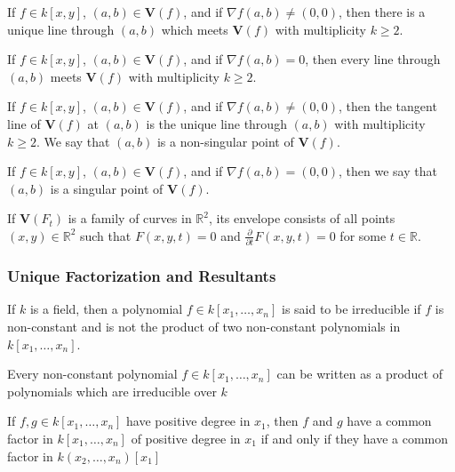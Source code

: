 \documentclass[../main.tex]{subfiles}
\begin{document}
\begin{theorem}
If $f\in k[x,y]$, $(a,b) \in \textbf{V}(f)$, and if $\nabla f(a,b) \ne (0,0)$, then there is a unique line through $(a,b)$ which meets $\textbf{V}(f)$ with multiplicity $k\geq 2$.
\end{theorem}

\begin{theorem}
If $f\in k[x,y]$, $(a,b) \in \textbf{V}(f)$, and if $\nabla f(a,b) = 0$, then every line through $(a,b)$ meets $\textbf{V}(f)$ with multiplicity $k \geq 2$.
\end{theorem}

\begin{definition}
If $f\in k[x,y]$, $(a,b) \in \textbf{V}(f)$, and if $\nabla f(a,b) \ne (0,0)$, then the tangent line of $\textbf{V}(f)$ at $(a,b)$ is the unique line through $(a,b)$ with multiplicity $k\geq 2$. We say that $(a,b)$ is a non-singular point of $\textbf{V}(f)$.
\end{definition}

\begin{definition}
If $f\in k[x,y]$, $(a,b) \in \textbf{V}(f)$, and if $\nabla f(a,b) = (0,0)$, then we say that $(a,b)$ is a singular point of $\textbf{V}(f)$.
\end{definition}

\begin{definition}
If $\textbf{V}(F_t)$ is a family of curves in $\mathbb{R}^2$, its envelope consists of all points $(x,y) \in \mathbb{R}^2$ such that $F(x,y,t) = 0$ and $\frac{\partial}{\partial t}F(x,y,t) = 0$ for some $t\in \mathbb{R}$.
\end{definition}
%
\subsubsection{Unique Factorization and Resultants}
%
\begin{definition}
If $k$ is a field, then a polynomial $f\in k[x_1,\hdots ,x_n]$ is said to be irreducible if $f$ is non-constant and is not the product of two non-constant polynomials in $k[x_1,\hdots ,x_n]$.
\end{definition}

\begin{theorem}
Every non-constant polynomial $f\in k[x_1,\hdots ,x_n]$ can be written as a product of polynomials which are irreducible over $k$
\end{theorem}

\begin{theorem}
If $f,g\in k[x_1,\hdots ,x_n]$ have positive degree in $x_1$, then $f$ and $g$ have a common factor in $k[x_1,\hdots ,x_n]$ of positive degree in $x_1$ if and only if they have a common factor in $k(x_2,\hdots, x_n)[x_1]$
\end{theorem}
\end{document}
